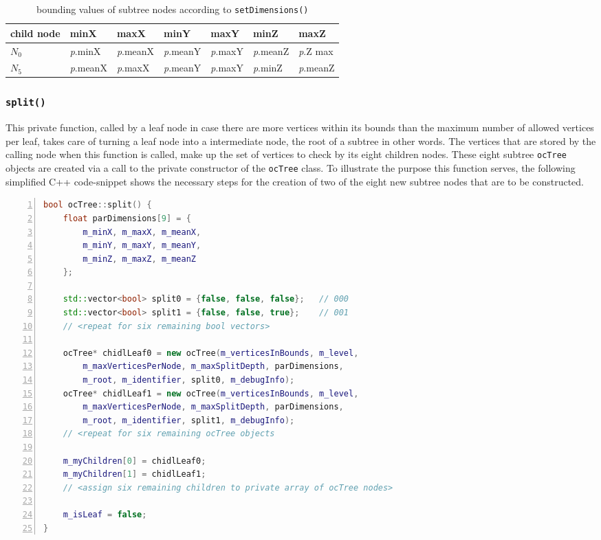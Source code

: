 \begin{table}[]
\begin{tabular}{l|llllll}
child node & minX & maxX & minY & maxY & minZ & maxZ \\ \hline
\textit{$N_0$} & \textit{p}.minX & \textit{p}.meanX & \textit{p}.meanY & \textit{p}.maxY & \textit{p}.meanZ & \textit{p}.Z max \\
\textit{$N_5$} & \textit{p}.meanX & \textit{p}.maxX & \textit{p}.meanY & \textit{p}.maxY & \textit{p}.minZ & \textit{p}.meanZ \\
\end{tabular}
\caption{bounding values of subtree nodes according to \texttt{setDimensions()}}\label{tab:bounding_values_subtree_nodes}
\end{table}

	\subsubsection{\texttt{split()}}
	\label{sec:split}
This private function, called by a leaf node in case there are more vertices within its bounds than the maximum number of allowed vertices per leaf, takes care of turning a leaf node into a intermediate node, the root of a subtree in other words. The vertices that are stored by the calling node when this function is called, make up the set of vertices to check by its eight children nodes. These eight subtree \texttt{ocTree} objects are created via a call to the private constructor of the \texttt{ocTree} class. To illustrate the purpose this function serves, the following simplified C++ code-snippet shows the necessary steps for the creation of two of the eight new subtree nodes that are to be constructed.

\begin{minipage}{\linewidth}
\begin{lstlisting}[language=C++,numberstyle=\zebra{black!5}{white}{},numbers=left,xleftmargin=2em,tabsize=3]
bool ocTree::split() {
	float parDimensions[9] = {
		m_minX,	m_maxX,	m_meanX,
		m_minY,	m_maxY, m_meanY,
		m_minZ, m_maxZ, m_meanZ
	};

	std::vector<bool> split0 = {false, false, false};	// 000
	std::vector<bool> split1 = {false, false, true};	// 001
	// <repeat for six remaining bool vectors>

	ocTree* chidlLeaf0 = new ocTree(m_verticesInBounds, m_level,
		m_maxVerticesPerNode, m_maxSplitDepth, parDimensions,
		m_root, m_identifier, split0, m_debugInfo);
	ocTree* chidlLeaf1 = new ocTree(m_verticesInBounds, m_level,
		m_maxVerticesPerNode, m_maxSplitDepth, parDimensions,
		m_root, m_identifier, split1, m_debugInfo);
	// <repeat for six remaining ocTree objects

	m_myChildren[0] = chidlLeaf0;
	m_myChildren[1] = chidlLeaf1;
	// <assign six remaining children to private array of ocTree nodes>

	m_isLeaf = false;
}
\end{lstlisting}
\end{minipage}

